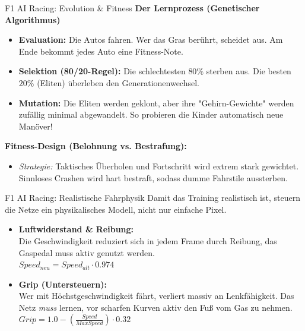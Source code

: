 \documentclass[aspectratio=169]{beamer}
\begin{document}
\begin{frame}{F1 AI Racing: Evolution \& Fitness}
\textbf{Der Lernprozess (Genetischer Algorithmus)}
\begin{itemize}
    \item \textbf{Evaluation:} Die Autos fahren. Wer das Gras berührt, scheidet aus. Am Ende bekommt jedes Auto eine Fitness-Note.
    \item \textbf{Selektion (80/20-Regel):} Die schlechtesten $80\%$ sterben aus. Die besten $20\%$ (Eliten) überleben den Generationenwechsel.
    \item \textbf{Mutation:} Die Eliten werden geklont, aber ihre "Gehirn-Gewichte" werden zufällig minimal abgewandelt. So probieren die Kinder automatisch neue Manöver!
\end{itemize}

\vspace{0.2cm}
\textbf{Fitness-Design (Belohnung vs. Bestrafung):}
\begin{center}
\end{center}
\begin{itemize}
    \item \textit{Strategie:} Taktisches Überholen und Fortschritt wird extrem stark gewichtet. Sinnloses Crashen wird hart bestraft, sodass dumme Fahrstile aussterben.
\end{itemize}
\end{frame}

\begin{frame}{F1 AI Racing: Realistische Fahrphysik}
Damit das Training realistisch ist, steuern die Netze ein physikalisches Modell, nicht nur einfache Pixel.

\vspace{0.3cm}
\begin{itemize}
    \item \textbf{Luftwiderstand \& Reibung:} \\
    Die Geschwindigkeit reduziert sich in jedem Frame durch Reibung, das Gaspedal muss aktiv genutzt werden.\\
    $Speed_{neu} = Speed_{alt} \cdot 0.974$
    
    \vspace{0.3cm}
    \item \textbf{Grip (Untersteuern):} \\
    Wer mit Höchstgeschwindigkeit fährt, verliert massiv an Lenkfähigkeit. Das Netz \textit{muss} lernen, vor scharfen Kurven aktiv den Fuß vom Gas zu nehmen.\\
    $Grip = 1.0 - \left( \frac{Speed}{MaxSpeed} \right) \cdot 0.32$
\end{itemize}
\end{frame}
\end{document}
